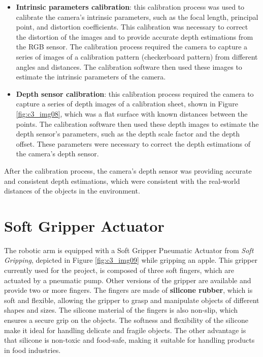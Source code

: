 \begin{itemize}
    \item \textbf{Intrinsic parameters calibration}: this calibration process was used to calibrate the camera's 
    intrinsic parameters,
    such as the focal length, principal point, and distortion coefficients. This calibration was necessary to correct
    the distortion of the images and to provide accurate depth estimations from the RGB sensor. The calibration process
    required the camera to capture a series of images of a calibration pattern (checkerboard pattern) from different angles
    and distances. The calibration software then used these images to estimate the intrinsic parameters of the camera.
    \item \textbf{Depth sensor calibration}: this calibration process required the camera to capture a series of
    depth images of a calibration sheet, shown in Figure \ref{fig:c3_img08}, 
    which was a flat surface with known distances between the points.
    The calibration software then used these depth images to estimate the depth sensor's parameters, 
    such as the depth scale factor and the depth offset. 
    These parameters were necessary to correct the depth estimations of the camera's depth sensor.
\end{itemize}


After the calibration process, the camera's depth sensor was providing accurate and consistent depth estimations,
which were consistent with the real-world distances of the objects in the environment.

\section{Soft Gripper Actuator}

The robotic arm is equipped with a Soft Gripper Pneumatic Actuator from \textit{Soft Gripping}, depicted in Figure 
\ref{fig:c3_img09} while gripping an apple.
This gripper currently used for the project, is composed of three soft fingers, which are actuated by a pneumatic pump. 
Other versions of the gripper are available and provide two or more fingers. The fingers are made of
\textbf{silicone rubber}, which is soft and flexible, allowing the gripper to grasp and manipulate objects of different shapes
and sizes. The silicone material of the fingers is also non-slip, which ensures a secure grip on the objects.
The softness and flexibility of the silicone make it ideal for handling delicate and fragile objects.
The other advantage is that silicone is non-toxic and food-safe, making it suitable for handling products
in food industries.

